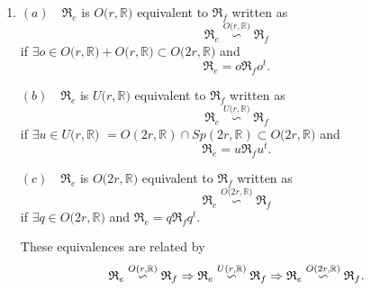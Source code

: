 \documentclass[aps,preprint]{revtex4}
\begin{document}
\begin{enumerate}
\item $\left( a\right) \quad \mathfrak{R}_{e}$ is $O(r,\mathbb{R)}$
equivalent to $\mathfrak{R}_{f}$ written as 
\begin{equation}
\mathfrak{R}_{e}\overset{O(r,\mathbb{R)}}{\backsim }\mathfrak{R}_{f}
\end{equation}%
if $\exists o\in O(r,\mathbb{R)}+O(r,\mathbb{R)\subset }O(2r,\mathbb{R)}$
and 
\begin{equation}
\mathfrak{R}_{e}=o\mathfrak{R}_{f}o^{t}.
\end{equation}

$\left( b\right) \quad \mathfrak{R}_{e}$ is $U(r,\mathbb{R)}$ equivalent to $%
\mathfrak{R}_{f}$ written as 
\begin{equation}
\mathfrak{R}_{e}\overset{U(r,\mathbb{R)}}{\backsim }\mathfrak{R}_{f}
\end{equation}%
if $\exists u\in U(r,\mathbb{R)}$ $=O\left( 2r,\mathbb{R}\right) \cap
Sp\left( 2r,\mathbb{R}\right) \subset O(2r,\mathbb{R)}$ and 
\begin{equation}
\mathfrak{R}_{e}=u\mathfrak{R}_{f}u^{t}.
\end{equation}

$\left( c\right) \quad \mathfrak{R}_{e}$ is $O(2r,\mathbb{R)}$ equivalent to 
$\mathfrak{R}_{f}$ written as 
\begin{equation}
\mathfrak{R}_{e}\overset{O(2r,\mathbb{R)}}{\backsim }\mathfrak{R}_{f}
\end{equation}%
if $\exists q\in O(2r,\mathbb{R)}$ and $\mathfrak{R}_{e}=q\mathfrak{R}%
_{f}q^{t}.$

These equivalences are related by 
\begin{equation}
\mathfrak{R}_{e}\overset{O(r,\mathbb{R)}}{\backsim }\mathfrak{R}%
_{f}\Rightarrow \mathfrak{R}_{e}\overset{U(r,\mathbb{R)}}{\backsim }%
\mathfrak{R}_{f}\Rightarrow \mathfrak{R}_{e}\overset{O(2r,\mathbb{R)}}{%
\backsim }\mathfrak{R}_{f}.
\end{equation}


\end{enumerate}
\end{document}
